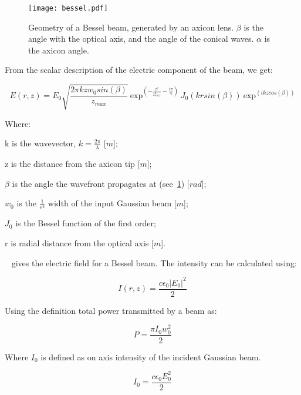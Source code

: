 \begin{figure}[!ht]
    \centering
    \texttt{[image: bessel.pdf]}
    \caption{Geometry of a Bessel beam, generated by an axicon lens. $\beta$ is the angle with the optical axis, and the angle of the conical waves. $\alpha$ is the axicon angle.}
    \label{fig:besselgeo}
\end{figure}

From the scalar description of the electric component of the beam, we get:

\begin{equation}
    E(r,z)=E_0\sqrt{\frac{2\pi k z w_0sin(\beta)}{z_{max}}}\ \text{exp}^{\left(-\frac{z^2}{z_{max}^2}-\frac{i\pi}{4}\right)}\ J_0\left(krsin(\beta)\right)\ \text{exp}^{\left(ikzcos(\beta)\right)}
    \label{eqn:besselEfield}
\end{equation}

\noindent Where:

    \indent k is the wavevector, $k=\tfrac{2\pi}{\lambda}$ [$m$];

    \indent z is the distance from the axicon tip [$m$]; 

    \indent $\beta$ is the angle the wavefront propagates at (see~\cref{fig:besselgeo}) [$rad$]; 

    \indent $w_0$ is the $\tfrac{1}{e^2}$ width of the input Gaussian beam [$m$]; 

    \indent $J_0$ is the Bessel function of the first order; 

    \indent r is radial distance from the optical axis [$m$]. 

\medskip


~ gives the electric field for a Bessel beam. The intensity can be calculated using:

\begin{equation}
    I(r,z)=\frac{c\epsilon_0\left|E_0\right|^2}{2}
    \label{eqn:besselintsub}
\end{equation}

Using the definition total power transmitted by a beam as:

\begin{equation}
    P=\frac{\pi I_0w_0^2}{2}
    \label{eqn:pwrdef}
\end{equation}

Where $I_0$ is defined as on axis intensity of the incident Gaussian beam.

\begin{equation}
    I_0=\frac{c\epsilon_0E_0^2}{2}
    \label{eqn:intdef}
\end{equation}

